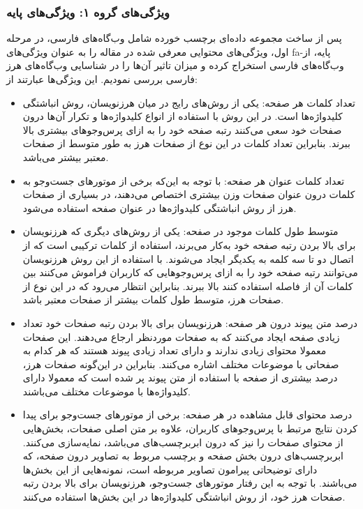\documentclass[twoside, a4paper,11pt]{book}
\numberwithin{equation}{chapter}
\numberwithin{table}{chapter}
\numberwithin{figure}{chapter}
\numberwithin{equation}{chapter}
\newcommand{\mls}[1]{\gls{fa-#1}\glsuseri{la-#1}}
\begin{document}
\subsubsection{ویژگی‌های گروه ۱: ویژگی‌های پایه}
پس از ساخت مجموعه داده‌ای برچسب خورده شامل وب‌گاه‌های فارسی، در مرحله اول، ویژگی‌های محتوایی معرفی شده در مقاله \cite{Ntoulas:2006} را به عنوان ویژگی‌های \mls{پایه}، از وب‌گاه‌های فارسی استخراج کرده و میزان تاثیر آن‌‌ها را در شناسایی وب‌گاه‌های هرز فارسی بررسی نمودیم. این ویژگی‌ها عبارتند از:
\begin{itemize}
\item
تعداد کلمات هر صفحه: یکی از روش‌های رایج در میان هرزنویسان، روش انباشتگی کلید‌واژه‌ها است. در این روش با استفاده از انواع کلیدواژه‌ها و تکرار آن‌ها درون صفحات خود سعی می‌کنند رتبه صفحه خود را به ازای پرس‌وجوهای بیشتری بالا ببرند. بنابراین تعداد کلمات در این نوع از صفحات هرز به طور متوسط از صفحات معتبر بیشتر می‌باشد.
\item
تعداد کلمات عنوان هر صفحه: با توجه به این‌که برخی از موتورهای جست‌و‌جو به کلمات درون عنوان صفحات وزن بیشتری اختصاص می‌دهند، در بسیاری از صفحات هرز از روش انباشتگی کلید‌واژه‌ها در عنوان صفحه استفاده می‌شود.
\item
متوسط طول کلمات موجود در صفحه: یکی از روش‌های دیگری که هرزنویسان برای بالا بردن رتبه صفحه خود به‌کار می‌برند، استفاده از کلمات ترکیبی است که از اتصال دو تا سه کلمه به یکدیگر ایجاد می‌شوند. با استفاده از این روش هرزنویسان می‌توانند رتبه صفحه خود را به ازای پرس‌وجوهایی که کاربران فراموش می‌کنند بین کلمات آن از فاصله استفاده کنند بالا ببرند. بنابراین انتظار می‌رود که در این نوع از صفحات هرز، متوسط طول کلمات بیشتر از صفحات معتبر باشد.
\item
درصد متن پیوند درون هر صفحه: هرزنویسان برای بالا بردن رتبه صفحات خود تعداد زیادی صفحه ایجاد می‌کنند که به صفحات موردنظر ارجاع می‌دهند. این صفحات معمولا محتوای زیادی ندارند و دارای تعداد زیادی پیوند هستند که هر کدام به صفحاتی با موضوعات مختلف اشاره می‌کنند. بنابراین در این‌گونه صفحات هرز، درصد بیشتری از صفحه با استفاده از متن پیوند پر شده است که معمولا دارای کلیدواژه‌ها با موضوعات مختلف می‌باشند.
\item
درصد محتوای قابل مشاهده در هر صفحه: برخی از موتورهای جست‌و‌جو برای پیدا کردن نتایج مرتبط با پرس‌وجوهای کاربران، علاوه بر متن اصلی صفحات،  بخش‌هایی از محتوای صفحات را نیز که درون ابربرچسب‌های  می‌باشد، نمایه‌سازی می‌کنند. ابربرچسب‌های درون بخش  صفحه و برچسب   مربوط به تصاویر درون صفحه، که دارای توضیحاتی پیرامون تصاویر مربوطه است، نمونه‌هایی از این بخش‌ها می‌باشند. با توجه به این رفتار موتورهای جست‌و‌جو، هرزنویسان برای بالا بردن رتبه صفحات هرز خود، از روش انباشتگی کلید‌واژه‌ها در این بخش‌ها استفاده می‌کنند. 

\end{itemize}
\end{document}
